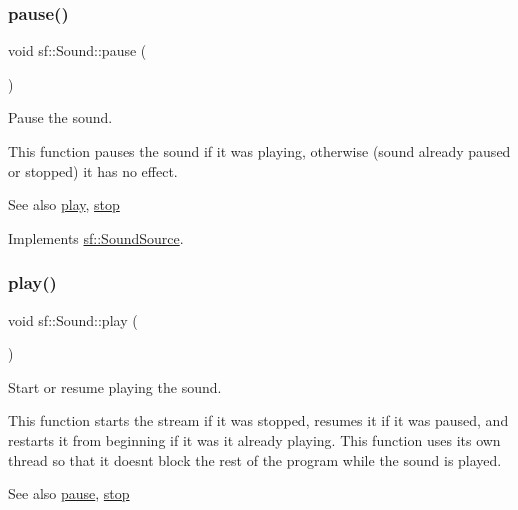 \subsubsection{\texorpdfstring{pause()}{pause()}}
{\footnotesize\ttfamily void sf\+::\+Sound\+::pause (\begin{DoxyParamCaption}{ }\end{DoxyParamCaption})\hspace{0.3cm}{\ttfamily [virtual]}}



Pause the sound. 

This function pauses the sound if it was playing, otherwise (sound already paused or stopped) it has no effect.

\begin{DoxySeeAlso}{See also}
\mbox{\hyperlink{classsf_1_1_sound_a2953ffe632536e72e696fd880ced2532}{play}}, \mbox{\hyperlink{classsf_1_1_sound_aa9c91c34f7c6d344d5ee9b997511f754}{stop}} \begin{DoxyVerb}\end{DoxyVerb}
 
\end{DoxySeeAlso}


Implements \mbox{\hyperlink{classsf_1_1_sound_source_a21553d4e8fcf136231dd8c7ad4630aba}{sf\+::\+Sound\+Source}}.

\mbox{\label{classsf_1_1_sound_a2953ffe632536e72e696fd880ced2532}} 
\subsubsection{\texorpdfstring{play()}{play()}}
{\footnotesize\ttfamily void sf\+::\+Sound\+::play (\begin{DoxyParamCaption}{ }\end{DoxyParamCaption})\hspace{0.3cm}{\ttfamily [virtual]}}



Start or resume playing the sound. 

This function starts the stream if it was stopped, resumes it if it was paused, and restarts it from beginning if it was it already playing. This function uses its own thread so that it doesn\textquotesingle{}t block the rest of the program while the sound is played.

\begin{DoxySeeAlso}{See also}
\mbox{\hyperlink{classsf_1_1_sound_a5eeb25815bfa8cdc4a6cc000b7b19ad5}{pause}}, \mbox{\hyperlink{classsf_1_1_sound_aa9c91c34f7c6d344d5ee9b997511f754}{stop}} \begin{DoxyVerb}\end{DoxyVerb}
 
\end{DoxySeeAlso}


